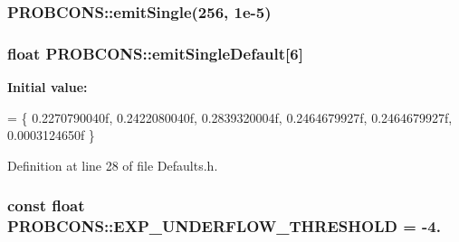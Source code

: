 \hypertarget{namespace_p_r_o_b_c_o_n_s_a60ce52cd8ccb26631e13fecca788f13e}{
\subsubsection[{emit\+Single}]{ P\+R\+O\+B\+C\+O\+N\+S\+::emit\+Single(256, 1e-\/5)}}\label{namespace_p_r_o_b_c_o_n_s_a60ce52cd8ccb26631e13fecca788f13e}
\hypertarget{namespace_p_r_o_b_c_o_n_s_ae1a79b9f9d56a9e4a4fb4549fbfd8c26}{
\subsubsection[{emit\+Single\+Default}]{\setlength{\rightskip}{0pt plus 5cm}float P\+R\+O\+B\+C\+O\+N\+S\+::emit\+Single\+Default\mbox{[}6\mbox{]}}}\label{namespace_p_r_o_b_c_o_n_s_ae1a79b9f9d56a9e4a4fb4549fbfd8c26}
{\bfseries Initial value\+:}
\begin{DoxyCode}
= \{
  0.2270790040f, 0.2422080040f, 0.2839320004f, 0.2464679927f, 0.2464679927f, 0.0003124650f 
\}
\end{DoxyCode}


Definition at line 28 of file Defaults.\+h.

\hypertarget{namespace_p_r_o_b_c_o_n_s_a4074cb3928409c0f0b0d7fce9d2576b0}{
\subsubsection[{E\+X\+P\+\_\+\+U\+N\+D\+E\+R\+F\+L\+O\+W\+\_\+\+T\+H\+R\+E\+S\+H\+O\+L\+D}]{\setlength{\rightskip}{0pt plus 5cm}const float P\+R\+O\+B\+C\+O\+N\+S\+::\+E\+X\+P\+\_\+\+U\+N\+D\+E\+R\+F\+L\+O\+W\+\_\+\+T\+H\+R\+E\+S\+H\+O\+L\+D = -\/4.}}\label{namespace_p_r_o_b_c_o_n_s_a4074cb3928409c0f0b0d7fce9d2576b0}



